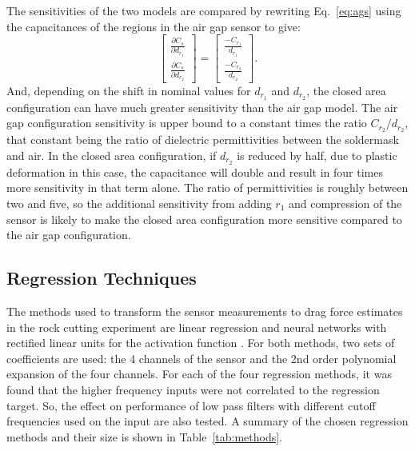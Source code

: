 The sensitivities of the two models are compared by rewriting Eq.~\ref{eq:ags}
using the capacitances of the regions in the air gap sensor to give:
\begin{equation}
\begin{bmatrix}
\frac{\partial C_s}{\partial d_{r_1}} \\[1em]
\frac{\partial C_s}{\partial d_{r_2}} \end{bmatrix} = 
\begin{bmatrix}
\frac{-C_{r_1}}{d_{r_1}} \\[1em]
\frac{-C_{r_2}}{d_{r_2}}
\end{bmatrix}.
\end{equation}
And, depending on the shift in nominal values for $d_{r_1}$ and $d_{r_2}$, the closed area configuration 
can have much greater sensitivity than the air gap model. 
The air gap configuration sensitivity is upper bound to a constant times the ratio $C_{r_2} / d_{r_2}$, 
that constant being the ratio of dielectric permittivities between the soldermask and air.
In the closed area configuration, if $d_{r_2}$ is reduced by half,
due to plastic deformation in this case, 
the capacitance will double and result in four times more sensitivity in that term alone.
The ratio of permittivities is roughly between two and five, so 
the additional sensitivity from adding $r_1$ and compression of the sensor
is likely to make the closed area configuration more sensitive compared to the air gap configuration.

\subsection{Regression Techniques \label{sub:reg}}

The methods used to transform the sensor measurements to drag force estimates 
in the rock cutting experiment are linear regression \cite{Maulud2020} 
and neural networks with rectified linear units for the activation function \cite{Hu2019, Hara2015}. 
For both methods, two sets of coefficients are used: the 4 channels of the sensor 
and the 2nd order polynomial expansion of the four channels. 
For each of the four regression methods, it was found that 
the higher frequency inputs were not correlated to the regression target.
So, the effect on performance of low pass filters with different cutoff frequencies 
used on the input are also tested.
A summary of the chosen regression methods and their size is shown in Table~\ref{tab:methods}.

